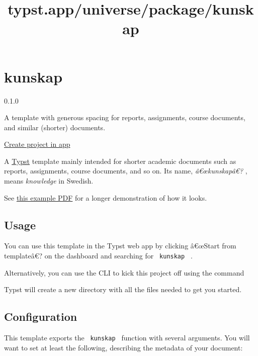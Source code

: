 \title{typst.app/universe/package/kunskap}

\label{banner}
\label{template-thumbnail}

\section{kunskap}\label{kunskap}

{ 0.1.0 }

A template with generous spacing for reports, assignments, course
documents, and similar (shorter) documents.

\href{/app?template=kunskap&version=0.1.0}{Create project in app}

\label{readme}
A \href{https://typst.app/}{Typst} template mainly intended for shorter
academic documents such as reports, assignments, course documents, and
so on. Its name, \emph{â€œkunskapâ€?} , means \emph{knowledge} in
Swedish.

See
\href{https://github.com/mbollmann/typst-kunskap/blob/main/example.pdf}{this
example PDF} for a longer demonstration of how it looks.

\subsection{Usage}\label{usage}

You can use this template in the Typst web app by clicking â€œStart from
templateâ€? on the dashboard and searching for \texttt{\ kunskap\ } .

Alternatively, you can use the CLI to kick this project off using the
command

\begin{Shaded}
\begin{Highlighting}[]
\end{Highlighting}
\end{Shaded}

Typst will create a new directory with all the files needed to get you
started.

\subsection{Configuration}\label{configuration}

This template exports the \texttt{\ kunskap\ } function with several
arguments. You will want to set at least the following, describing the
metadata of your document:

